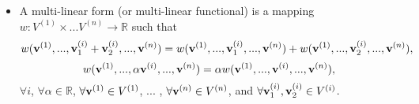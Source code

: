 \documentclass[11pt]{article}
\begin{document}
\begin{itemize}
    \item A multi-linear form (or multi-linear functional) is a mapping $w: V^{(1)} \times ... V^{(n)} \to \mathbb{R}$ such that
    \begin{equation}
        w(\mathbf{v}^{(1)}, ..., \mathbf{v}^{(i)}_1 + \mathbf{v}^{(i)}_2, ... , \mathbf{v}^{(n)}) = w(\mathbf{v}^{(1)}, ..., \mathbf{v}^{(i)}_1, ... , \mathbf{v}^{(n)}) + w(\mathbf{v}^{(1)}, ..., \mathbf{v}^{(i)}_2, ... , \mathbf{v}^{(n)}),
    \end{equation}
    \begin{equation}
        w(\mathbf{v}^{(1)}, ..., \alpha \mathbf{v}^{(i)}, ... , \mathbf{v}^{(n)}) = \alpha w(\mathbf{v}^{(1)}, ..., \mathbf{v}^{(i)}, ... , \mathbf{v}^{(n)}),
    \end{equation}
    $\forall i$, $\forall \alpha \in \mathbb{R}$, $\forall \mathbf{v}^{(1)} \in V^{(1)}$, ... , $\forall \mathbf{v}^{(n)} \in V^{(n)}$, and $\forall \mathbf{v}^{(i)}_1, \mathbf{v}^{(i)}_2 \in V^{(i)}$.

\end{itemize}

\end{document}
